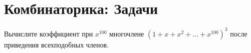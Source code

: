 \section{Комбинаторика: Задачи}

\begin{problem}
	Вычислите коэффициент при $ x^{100} $ многочлене $\left(1+x+x^{2}+\ldots+x^{100}\right)^{3}$ после приведения всехподобных членов.
\end{problem}